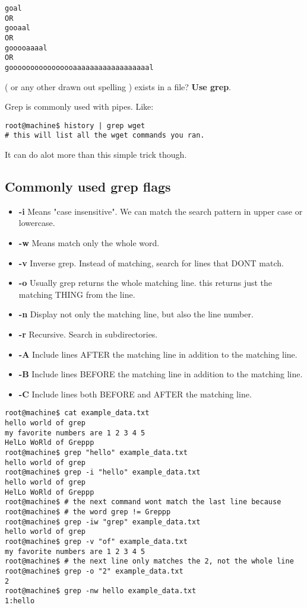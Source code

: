 \documentclass[12pt,a4paper]{article}
\begin{document}
\begin{verbatim}
goal
OR
gooaal
OR
gooooaaaal
OR
goooooooooooooooaaaaaaaaaaaaaaaaaal
\end{verbatim}

( or any other drawn out spelling ) exists in a file? \textbf{Use grep}.

Grep is commonly used with pipes. Like:

\begin{lstlisting}
root@machine$ history | grep wget
# this will list all the wget commands you ran.
\end{lstlisting}

It can do alot more than this simple trick though.

\subsection{Commonly used grep flags}
\begin{itemize}
\item \textbf{-i} Means "case insensitive". We can match the search pattern in
upper case or lowercase.
\item \textbf{-w} Means match only the whole word.
\item \textbf{-v} Inverse grep. Instead of matching, search for lines that DONT
match.
\item \textbf{-o} Usually grep returns the whole matching line. this returns
just the matching THING from the line.
\item \textbf{-n} Display not only the matching line, but also the line number.
\item \textbf{-r} Recursive. Search in subdirectories.
\item \textbf{-A} Include lines AFTER the matching line in addition to the
matching line.
\item \textbf{-B} Include lines BEFORE the matching line in addition to the
matching line.
\item \textbf{-C} Include lines both BEFORE and AFTER the matching line.
\end{itemize}


\begin{lstlisting}[style=term]
root@machine$ cat example_data.txt
hello world of grep
my favorite numbers are 1 2 3 4 5
HelLo WoRld of Greppp
root@machine$ grep "hello" example_data.txt
hello world of grep
root@machine$ grep -i "hello" example_data.txt
hello world of grep
HelLo WoRld of Greppp
root@machine$ # the next command wont match the last line because 
root@machine$ # the word grep != Greppp 
root@machine$ grep -iw "grep" example_data.txt 
hello world of grep
root@machine$ grep -v "of" example_data.txt
my favorite numbers are 1 2 3 4 5
root@machine$ # the next line only matches the 2, not the whole line
root@machine$ grep -o "2" example_data.txt
2
root@machine$ grep -nw hello example_data.txt
1:hello
\end{lstlisting}
\end{document}

